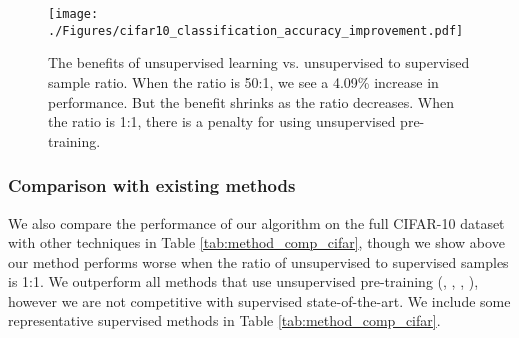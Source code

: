 \documentclass{article} \usepackage{iclr2015,times}
\begin{document}
\begin{wrapfigure}{R}{0.55\textwidth}
\vspace{-0.6cm}
\centering
\texttt{[image: ./Figures/cifar10\_classification\_accuracy\_improvement.pdf]}
\caption{The benefits of unsupervised learning vs. unsupervised to supervised sample ratio. When the ratio is 50:1, we see a 4.09\% increase in performance. But the benefit shrinks as the ratio decreases. When the ratio is 1:1, there is a penalty for using unsupervised pre-training.}
\label{fig:decay_plot}
\vspace{-1.2cm}
\end{wrapfigure}


\subsubsection{Comparison with existing methods}

We also compare the performance of our algorithm on the full CIFAR-10 dataset with other techniques in Table \ref{tab:method_comp_cifar}, though we show above our method performs worse when the ratio of unsupervised to supervised samples is 1:1. We outperform all methods that use unsupervised pre-training (\citet{masci2011stacked}, \citet{coates2011analysis}, \citet{dosovitskiy2014discriminative}, \citet{lin2014stable}), however we are not competitive with supervised state-of-the-art. We include some representative supervised methods in Table \ref{tab:method_comp_cifar}. 
\end{document}
